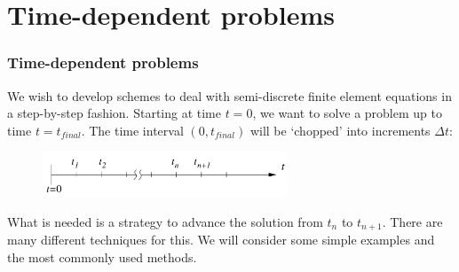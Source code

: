 \documentclass[notes]{beamer}
\begin{document}



\section{Time-dependent problems}
\begin{frame}
\frametitle{Time-dependent problems}

We wish to develop schemes to deal with semi-discrete finite element equations in a
step-by-step fashion. Starting at time $t = 0$, we want to solve a problem up to time
$t = t_{final}$. The time interval $(0, t_{final})$ will be `chopped' into increments $\Delta t$:
\begin{figure}[ht]
	\centering
	\includegraphics[width=0.65\textwidth]{figs/time-steps.png}
\end{figure}

What is needed is a strategy to advance the solution from $t_n$ to $t_{n+1}$. There are many
different techniques for this. We will consider some simple examples and the most commonly used methods.

\end{frame}
\end{document}
